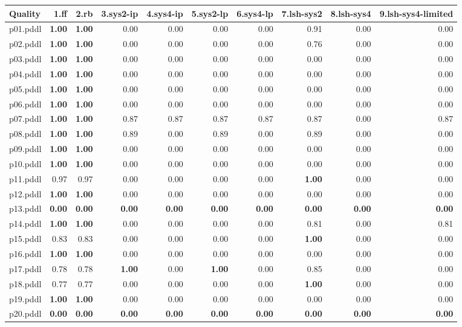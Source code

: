\documentclass{article}
\begin{document}
\begin{tabular}{@{}lrrrrrrrrr@{}}
Quality & 1.ff & 2.rb & 3.sys2-ip & 4.sys4-ip & 5.sys2-lp & 6.sys4-lp & 7.lsh-sys2 & 8.lsh-sys4 & 9.lsh-sys4-limited \\
\midrule
p01.pddl & \textbf{1.00} & \textbf{1.00} & 0.00 & 0.00 & 0.00 & 0.00 & 0.91 & 0.00 & 0.00 \\
p02.pddl & \textbf{1.00} & \textbf{1.00} & 0.00 & 0.00 & 0.00 & 0.00 & 0.76 & 0.00 & 0.00 \\
p03.pddl & \textbf{1.00} & \textbf{1.00} & 0.00 & 0.00 & 0.00 & 0.00 & 0.00 & 0.00 & 0.00 \\
p04.pddl & \textbf{1.00} & \textbf{1.00} & 0.00 & 0.00 & 0.00 & 0.00 & 0.00 & 0.00 & 0.00 \\
p05.pddl & \textbf{1.00} & \textbf{1.00} & 0.00 & 0.00 & 0.00 & 0.00 & 0.00 & 0.00 & 0.00 \\
p06.pddl & \textbf{1.00} & \textbf{1.00} & 0.00 & 0.00 & 0.00 & 0.00 & 0.00 & 0.00 & 0.00 \\
p07.pddl & \textbf{1.00} & \textbf{1.00} & 0.87 & 0.87 & 0.87 & 0.87 & 0.87 & 0.00 & 0.87 \\
p08.pddl & \textbf{1.00} & \textbf{1.00} & 0.89 & 0.00 & 0.89 & 0.00 & 0.89 & 0.00 & 0.00 \\
p09.pddl & \textbf{1.00} & \textbf{1.00} & 0.00 & 0.00 & 0.00 & 0.00 & 0.00 & 0.00 & 0.00 \\
p10.pddl & \textbf{1.00} & \textbf{1.00} & 0.00 & 0.00 & 0.00 & 0.00 & 0.00 & 0.00 & 0.00 \\
p11.pddl & 0.97 & 0.97 & 0.00 & 0.00 & 0.00 & 0.00 & \textbf{1.00} & 0.00 & 0.00 \\
p12.pddl & \textbf{1.00} & \textbf{1.00} & 0.00 & 0.00 & 0.00 & 0.00 & 0.00 & 0.00 & 0.00 \\
p13.pddl & \textbf{0.00} & \textbf{0.00} & \textbf{0.00} & \textbf{0.00} & \textbf{0.00} & \textbf{0.00} & \textbf{0.00} & \textbf{0.00} & \textbf{0.00} \\
p14.pddl & \textbf{1.00} & \textbf{1.00} & 0.00 & 0.00 & 0.00 & 0.00 & 0.81 & 0.00 & 0.81 \\
p15.pddl & 0.83 & 0.83 & 0.00 & 0.00 & 0.00 & 0.00 & \textbf{1.00} & 0.00 & 0.00 \\
p16.pddl & \textbf{1.00} & \textbf{1.00} & 0.00 & 0.00 & 0.00 & 0.00 & 0.00 & 0.00 & 0.00 \\
p17.pddl & 0.78 & 0.78 & \textbf{1.00} & 0.00 & \textbf{1.00} & 0.00 & 0.85 & 0.00 & 0.00 \\
p18.pddl & 0.77 & 0.77 & 0.00 & 0.00 & 0.00 & 0.00 & \textbf{1.00} & 0.00 & 0.00 \\
p19.pddl & \textbf{1.00} & \textbf{1.00} & 0.00 & 0.00 & 0.00 & 0.00 & 0.00 & 0.00 & 0.00 \\
p20.pddl & \textbf{0.00} & \textbf{0.00} & \textbf{0.00} & \textbf{0.00} & \textbf{0.00} & \textbf{0.00} & \textbf{0.00} & \textbf{0.00} & \textbf{0.00} \\
\end{tabular}
\end{document}
